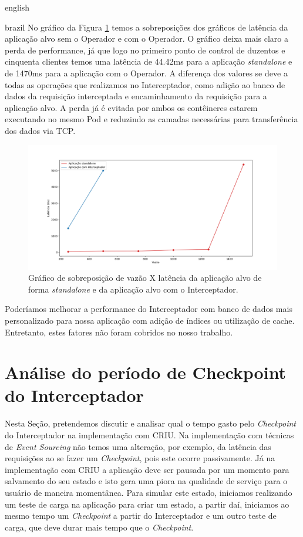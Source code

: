 \begin{otherlanguage*}{english}
\begin{otherlanguage*}{brazil}
No gráfico da Figura \ref{fig:analysis-interceptor-standalone} temos a sobreposições 
dos gráficos de latência da aplicação alvo sem o Operador e com o Operador. O gráfico
deixa mais claro a perda de performance, já que logo no primeiro ponto de control de
duzentos e cinquenta clientes temos uma latência de 44.42ms para a aplicação
\textit{standalone} e de 1470ms para a aplicação com o Operador. A diferença dos valores
se deve a todas as operações que realizamos no Interceptador, como adição ao banco de
dados da requisição interceptada e encaminhamento da requisição para a aplicação alvo.
A perda já é evitada por ambos os contêineres estarem executando no mesmo Pod e reduzindo
as camadas necessárias para transferência dos dados via TCP.

\begin{figure}[h]
\centering
\includegraphics[scale=0.46]{images/vazaolatencia.png}
\caption{Gráfico de sobreposição de vazão X latência da aplicação alvo de forma \textit{standalone} e da aplicação alvo com o Interceptador.}
\label{fig:analysis-interceptor-standalone}
\end{figure}

Poderíamos melhorar a performance do Interceptador com banco de dados mais personalizado para
nossa aplicação com adição de índices ou utilização de cache. Entretanto, estes fatores não
foram cobridos no nosso trabalho.

\section{Análise do período de Checkpoint do Interceptador}

Nesta Seção, pretendemos discutir e analisar qual o tempo gasto pelo \textit{Checkpoint} do
Interceptador na implementação com CRIU. Na implementação com técnicas de
\textit{Event Sourcing} não temos uma alteração, por exemplo, da latência das requisições ao
se fazer um \textit{Checkpoint}, pois este ocorre passivamente. Já na implementação com CRIU
a aplicação deve ser pausada por um momento para salvamento do seu estado e isto gera uma
piora na qualidade de serviço para o usuário de maneira momentânea. Para simular este estado,
iniciamos realizando um teste de carga na aplicação para criar um estado, a partir daí, iniciamos
ao mesmo tempo um \textit{Checkpoint} a partir do Interceptador e um outro teste de carga, que deve
durar mais tempo que o \textit{Checkpoint}.


\end{otherlanguage*}
\end{otherlanguage*}
